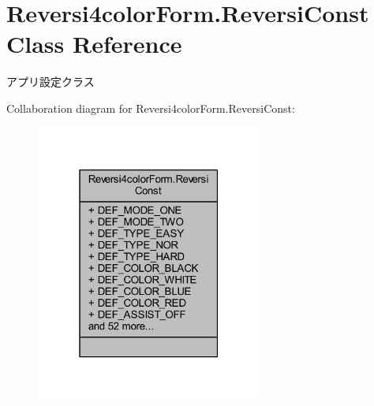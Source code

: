 \hypertarget{class_reversi4color_form_1_1_reversi_const}{}\section{Reversi4color\+Form.\+Reversi\+Const Class Reference}
\label{class_reversi4color_form_1_1_reversi_const}


アプリ設定クラス  




Collaboration diagram for Reversi4color\+Form.\+Reversi\+Const\+:
\nopagebreak
\begin{figure}[H]
\begin{center}
\leavevmode
\includegraphics[width=211pt]{class_reversi4color_form_1_1_reversi_const__coll__graph}
\end{center}
\end{figure}

